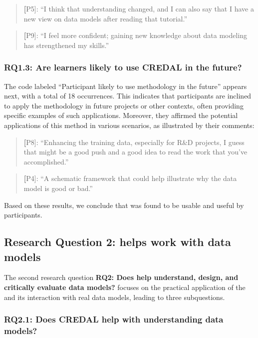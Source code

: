 \begin{quote}
\textbf[P5]: ``I think that understanding changed, and I can also say that I have a new view on data models after reading that tutorial.''
\end{quote}

\begin{quote}
\textbf[P9]: ``I feel more confident; gaining new knowledge about data modeling has strengthened my skills.''
\end{quote}

\subsubsection{\textbf{RQ1.3}: Are learners likely to use CREDAL in the future?}

The code labeled ``Participant likely to use methodology in the future'' appears next, with a total of 18 occurrences. This indicates that participants are inclined to apply the methodology in future projects or other contexts, often providing specific examples of such applications. Moreover, they affirmed the potential applications of this method in various scenarios, as illustrated by their comments:

\begin{quote}
\textbf[P8]: ``Enhancing the training data, especially for R\&D projects, I guess that might be a good push and a good idea to read the work that you've accomplished.''
\end{quote}
\begin{quote}
\textbf[P4]: ``A schematic framework that could help illustrate why the data model is good or bad.''
\end{quote}

Based on these results, we conclude that \credal was found to be usable and useful by participants. 

\subsection{Research Question 2: \credal helps work with data models}

The second research question \textbf{RQ2: Does \credal help understand, design, and critically evaluate data models?} focuses on the practical application of the \credal and its interaction with real data models, leading to three subquestions.

\subsubsection{\textbf{RQ2.1}: Does CREDAL help with understanding data models?}

